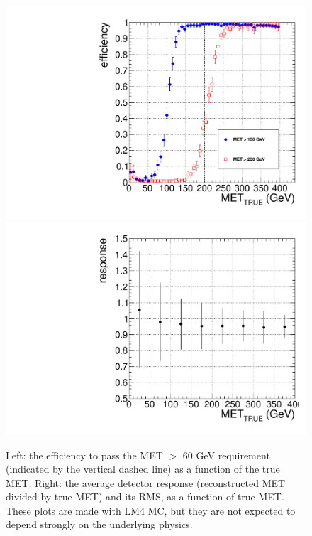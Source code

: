 \begin{figure}[tbh]
  \begin{center}
	\includegraphics[width=0.45\linewidth]{plots/met_efficiency.pdf}
	\includegraphics[width=0.45\linewidth]{plots/met_response.pdf}
	\caption{\label{fig:LM4_met}\protect 
	  Left: the efficiency to pass the MET $>$ 60 GeV requirement (indicated by the vertical dashed line)
	  as a function of the true MET. Right: the average detector response (reconstructed MET divided by true MET) 
	  and its RMS, as a function of true MET. These plots are made with LM4 MC, but they are 
	  not expected to depend
	  strongly on the underlying physics.}
  \end{center}
\end{figure}